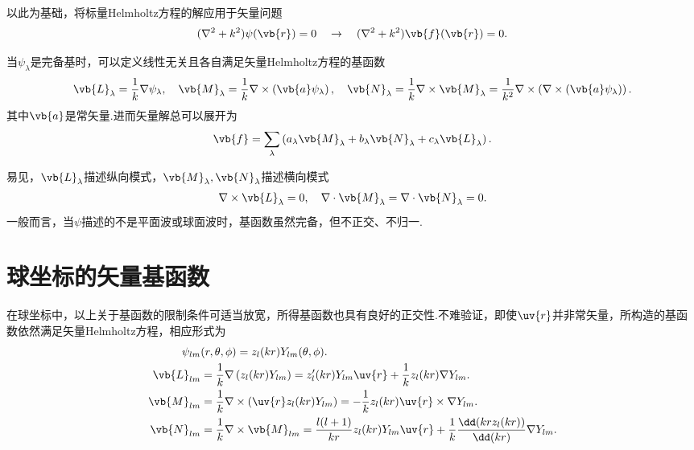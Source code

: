 以此为基础，将标量Helmholtz方程的解应用于矢量问题
\begin{align*}
	(\nabla^2 + k^2) \psi(\vb{r}) = 0 \quad\rightarrow\quad (\nabla^2 + k^2) \vb{f}(\vb{r}) = 0.
\end{align*}

当\(\psi_{\lambda}\)是完备基时，可以定义线性无关且各自满足矢量Helmholtz方程的基函数
\begin{align*}
	\vb{L}_{\lambda} = \frac{1}{k} \nabla \psi_{\lambda}, \quad
	\vb{M}_{\lambda} = \frac{1}{k} \nabla \times \left( \vb{a} \psi_{\lambda} \right), \quad
	\vb{N}_{\lambda} = \frac{1}{k} \nabla \times \vb{M}_{\lambda} = \frac{1}{k^2} \nabla \times \left( \nabla \times \left( \vb{a} \psi_{\lambda} \right) \right).
\end{align*}
其中\(\vb{a}\)是常矢量.进而矢量解总可以展开为
\begin{align*}
	\vb{f} = \sum_{\lambda} \left( a_{\lambda} \vb{M}_{\lambda} + b_{\lambda} \vb{N}_{\lambda} + c_{\lambda} \vb{L}_{\lambda} \right).
\end{align*}

易见，\(\vb{L}_{\lambda}\)描述纵向模式，\(\vb{M}_{\lambda}, \vb{N}_{\lambda}\)描述横向模式
\begin{align*}
	\nabla \times \vb{L}_{\lambda} = 0, \quad
	\nabla \cdot \vb{M}_{\lambda} = \nabla \cdot \vb{N}_{\lambda} = 0.
\end{align*}
一般而言，当\(\psi\)描述的不是平面波或球面波时，基函数虽然完备，但不正交、不归一.

\section{球坐标的矢量基函数}
在球坐标中，以上关于基函数的限制条件可适当放宽，所得基函数也具有良好的正交性.不难验证，即使\(\uv{r}\)并非常矢量，所构造的基函数依然满足矢量Helmholtz方程，相应形式为
\begin{align*}
	\psi_{lm}&(r, \theta, \phi) = z_l(kr) Y_{lm}(\theta, \phi). \\
	\vb{L}_{lm} &= \frac{1}{k} \nabla \left( z_l(kr) Y_{lm} \right) = z_l'(kr) Y_{lm} \uv{r} + \frac{1}{k} z_l(kr) \nabla Y_{lm}. \\
	\vb{M}_{lm} &= \frac{1}{k} \nabla \times \left( \uv{r} z_l(kr) Y_{lm} \right) = -\frac{1}{k} z_l(kr) \uv{r} \times \nabla Y_{lm}. \\
	\vb{N}_{lm} &= \frac{1}{k} \nabla \times \vb{M}_{lm} = \frac{l(l+1)}{kr} z_l(kr) Y_{lm} \uv{r} + \frac{1}{k} \frac{\dd(krz_l(kr))}{\dd(kr)} \nabla Y_{lm}.
\end{align*}

